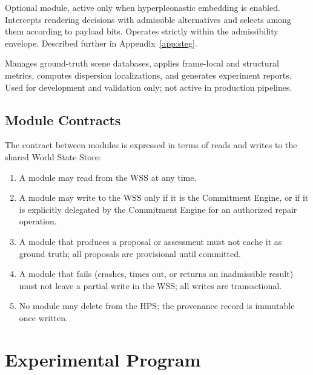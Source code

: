 \documentclass[12pt,a4paper]{article}
\theoremstyle{plain}
\theoremstyle{definition}
\theoremstyle{remark}
\begin{document}
\begin{description}[leftmargin=2em,itemsep=6pt]
\item[\textbf{Steganographic Selector Layer (SSL).}] Optional module, active only when hyperpleonastic embedding is enabled. Intercepts rendering decisions with admissible alternatives and selects among them according to payload bits. Operates strictly within the admissibility envelope. Described further in Appendix~\ref{app:steg}.

\item[\textbf{Evaluation Harness (EH).}] Manages ground-truth scene databases, applies frame-local and structural metrics, computes dispersion localizations, and generates experiment reports. Used for development and validation only; not active in production pipelines.

\end{description}

\subsection{Module Contracts}

The contract between modules is expressed in terms of reads and writes to the shared World State Store:

\begin{enumerate}[leftmargin=2em,itemsep=0pt]
\item A module may read from the WSS at any time.
\item A module may write to the WSS only if it is the Commitment Engine, or if it is explicitly delegated by the Commitment Engine for an authorized repair operation.
\item A module that produces a proposal or assessment must not cache it as ground truth; all proposals are provisional until committed.
\item A module that fails (crashes, times out, or returns an inadmissible result) must not leave a partial write in the WSS; all writes are transactional.
\item No module may delete from the HPS; the provenance record is immutable once written.
\end{enumerate}

\section{Experimental Program}
\label{sec:experiments}
\end{document}
